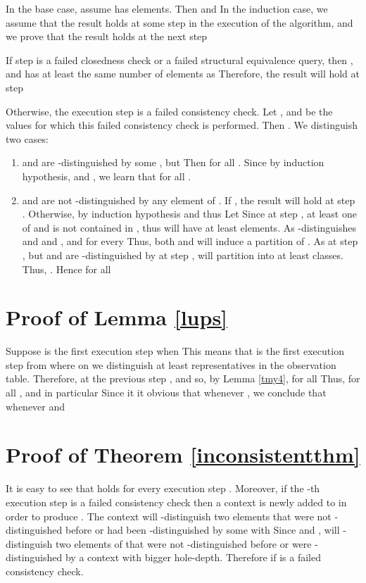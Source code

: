 \documentclass[preprint,12pt,english]{article}
\begin{document}
In the base case, assume  has  elements. Then  and 
In the induction case, we assume that the result holds at some step  in the execution of the algorithm, and we prove that the result holds at the next step  

If step  is a failed closedness check or a failed structural equivalence query, then , and  has at least the same number of elements as  Therefore, the result will hold at step 

Otherwise, the execution step  is a failed consistency check. Let  , and  be the values for which this failed consistency check is performed. Then . We distinguish two cases:
\begin{enumerate}
\item  and  are  -distinguished by some , but   Then   for all . Since   by induction hypothesis, and , we learn that   for all .
\item  and  are not -distinguished by any element of . If , the result will hold at step . Otherwise, by induction hypothesis  and thus  Let  Since  at step , at least one of  and  is not contained in , thus  will have at least  elements. As  -distinguishes   and  and ,  and  for every  Thus, both  and  will induce a partition of . As  at step , but  and  are -distinguished by  at step ,  will partition  into at least  classes. Thus, . Hence  for all  
 \end{enumerate}
\section{Proof of Lemma \ref{lups}}
Suppose  is the first execution step when  This means that  is the first execution step from where on  we distinguish at least  representatives in the observation table. Therefore, at the previous step ,  and so, by Lemma \ref{tmy4},  for all  Thus,  for all , and in particular  Since it it obvious that  whenever , we conclude that  whenever  and 
\section{Proof of Theorem \ref{inconsistentthm}}
It is easy to see that   holds for every execution step . Moreover, if the -th execution step is a failed consistency check then a  context  is newly added to  in order to produce . The context  will -distinguish two elements  that were not -distinguished before or had been -distinguished by some  with  Since  and ,  will -distinguish two elements of  that were not -distinguished before or were -distinguished by a context with bigger hole-depth. Therefore  if  is a failed  consistency check.
\end{document}
